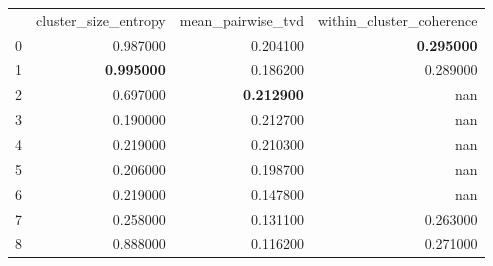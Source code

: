 \begin{tabular}{lrrr}
 & cluster_size_entropy & mean_pairwise_tvd & within_cluster_coherence \\
0 & 0.987000 & 0.204100 & \bfseries 0.295000 \\
1 & \bfseries 0.995000 & 0.186200 & 0.289000 \\
2 & 0.697000 & \bfseries 0.212900 & nan \\
3 & 0.190000 & 0.212700 & nan \\
4 & 0.219000 & 0.210300 & nan \\
5 & 0.206000 & 0.198700 & nan \\
6 & 0.219000 & 0.147800 & nan \\
7 & 0.258000 & 0.131100 & 0.263000 \\
8 & 0.888000 & 0.116200 & 0.271000 \\
\end{tabular}
